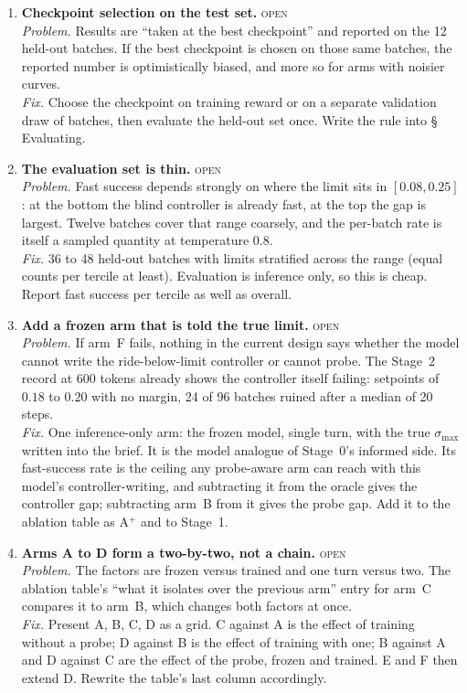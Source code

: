 \documentclass[11pt,a4paper]{article}
\newcommand{\status}[1]{\hfill{\small\textsc{#1}}}
\begin{document}
\begin{enumerate}[leftmargin=1.8em, itemsep=0.8em]
\item \textbf{Checkpoint selection on the test set.} \status{open}
\label{it:checkpoint}
\\
\emph{Problem.} Results are ``taken at the best checkpoint'' and reported
on the 12 held-out batches. If the best checkpoint is chosen on those same
batches, the reported number is optimistically biased, and more so for arms
with noisier curves.
\\
\emph{Fix.} Choose the checkpoint on training reward or on a separate
validation draw of batches, then evaluate the held-out set once. Write the
rule into \S\,Evaluating.

\item \textbf{The evaluation set is thin.} \status{open}
\label{it:evalset}
\\
\emph{Problem.} Fast success depends strongly on where the limit sits in
$[0.08, 0.25]$: at the bottom the blind controller is already fast, at the
top the gap is largest. Twelve batches cover that range coarsely, and the
per-batch rate is itself a sampled quantity at temperature $0.8$.
\\
\emph{Fix.} 36 to 48 held-out batches with limits stratified across the
range (equal counts per tercile at least). Evaluation is inference only,
so this is cheap. Report fast success per tercile as well as overall.

\item \textbf{Add a frozen arm that is told the true limit.} \status{open}
\label{it:informed-arm}
\\
\emph{Problem.} If arm~F fails, nothing in the current design says whether
the model cannot write the ride-below-limit controller or cannot probe.
The Stage~2 record at 600 tokens already shows the controller itself
failing: setpoints of $0.18$ to $0.20$ with no margin, 24 of 96 batches
ruined after a median of 20 steps.
\\
\emph{Fix.} One inference-only arm: the frozen model, single turn, with
the true $\sigma_{\max}$ written into the brief. It is the model analogue
of Stage~0's informed side. Its fast-success rate is the ceiling any
probe-aware arm can reach with this model's controller-writing, and
subtracting it from the oracle gives the controller gap; subtracting arm~B
from it gives the probe gap. Add it to the ablation table as A$^{+}$ and
to Stage~1.

\item \textbf{Arms A to D form a two-by-two, not a chain.} \status{open}
\label{it:2x2}
\\
\emph{Problem.} The factors are frozen versus trained and one turn versus
two. The ablation table's ``what it isolates over the previous arm'' entry
for arm~C compares it to arm~B, which changes both factors at once.
\\
\emph{Fix.} Present A, B, C, D as a grid. C against A is the effect of
training without a probe; D against B is the effect of training with one;
B against A and D against C are the effect of the probe, frozen and
trained. E and F then extend D. Rewrite the table's last column
accordingly.


\end{enumerate}
\end{document}
